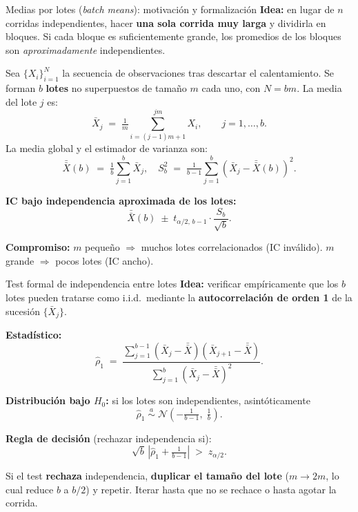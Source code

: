 \documentclass[aspectratio=1610, 10pt]{beamer}
\begin{document}
\begin{frame}{Medias por lotes (\emph{batch means}): motivación y formalización}
\textbf{Idea:} en lugar de $n$ corridas independientes, hacer \textbf{una sola corrida muy larga} y dividirla en bloques. Si cada bloque es suficientemente grande, los promedios de los bloques son \emph{aproximadamente} independientes.

\vspace{0.2cm}
\begin{definicionbox}
Sea $\{X_i\}_{i=1}^N$ la secuencia de observaciones tras descartar el calentamiento. Se forman $b$ \textbf{lotes} no superpuestos de tamaño $m$ cada uno, con $N=bm$. La media del lote $j$ es:
\[
\bar X_j \;=\; \tfrac{1}{m}\textstyle\sum_{i=(j-1)m+1}^{jm} X_i, \qquad j=1,\ldots,b.
\]
La media global y el estimador de varianza son:
\[
\bar{\bar X}(b) \;=\; \tfrac{1}{b}\textstyle\sum_{j=1}^{b} \bar X_j,
\quad
S_b^2 \;=\; \tfrac{1}{b-1}\textstyle\sum_{j=1}^{b} (\bar X_j - \bar{\bar X}(b))^2.
\]
\end{definicionbox}

\vspace{0.1cm}
\textbf{IC bajo independencia aproximada de los lotes:}
\[
\bar{\bar X}(b) \;\pm\; t_{\alpha/2,\,b-1}\cdot \frac{S_b}{\sqrt{b}}.
\]

\textbf{Compromiso:} $m$ pequeño $\Rightarrow$ muchos lotes correlacionados (IC inválido). $m$ grande $\Rightarrow$ pocos lotes (IC ancho).
\end{frame}

\begin{frame}{Test formal de independencia entre lotes}
\textbf{Idea:} verificar empíricamente que los $b$ lotes pueden tratarse como i.i.d.\ mediante la \textbf{autocorrelación de orden 1} de la sucesión $\{\bar X_j\}$.

\vspace{0.2cm}
\textbf{Estadístico:}
\[
\widehat\rho_1 \;=\; \frac{\sum_{j=1}^{b-1} (\bar X_j - \bar{\bar X})(\bar X_{j+1} - \bar{\bar X})}{\sum_{j=1}^{b}(\bar X_j - \bar{\bar X})^2}.
\]

\textbf{Distribución bajo $H_0$:} si los lotes son independientes, asintóticamente
\[
\widehat\rho_1 \;\stackrel{a}{\sim}\; \mathcal{N}\!\left(-\tfrac{1}{b-1},\; \tfrac{1}{b}\right).
\]

\textbf{Regla de decisión} (rechazar independencia si):
\[
\sqrt{b}\,\left|\widehat\rho_1 + \tfrac{1}{b-1}\right| \;>\; z_{\alpha/2}.
\]

\vspace{0.2cm}
\begin{metodobox}
Si el test \textbf{rechaza} independencia, \textbf{duplicar el tamaño del lote} ($m \to 2m$, lo cual reduce $b$ a $b/2$) y repetir. Iterar hasta que no se rechace o hasta agotar la corrida.
\end{metodobox}
\end{frame}
\end{document}
